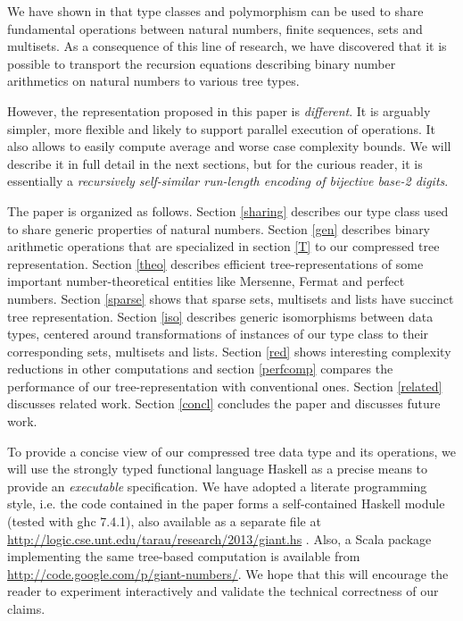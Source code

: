 \documentclass{TOOLS/llncs}
\begin{document}
We have shown in \cite{ppdp10tarau} that type classes
and polymorphism can be used to
share fundamental operations between natural numbers, 
finite sequences, sets and multisets.
As a consequence of this line of research, we have
discovered that it is possible to transport the recursion equations
describing binary number arithmetics on natural numbers
to various tree types.

However, the representation proposed in this paper is {\em different}. It is arguably 
simpler, more flexible and likely to support parallel execution of
operations.  It also allows to easily compute average and worse
case complexity bounds. We will describe it in full detail in the next
sections, but for the curious reader, it is essentially a {\em recursively self-similar 
run-length encoding of bijective base-2 digits}.


The paper is organized as follows. Section \ref{sharing} describes 
our type class used to share generic properties of natural numbers.
Section \ref{gen} describes binary arithmetic operations that
are specialized in section \ref{T} to our compressed tree representation.
Section \ref{theo} describes efficient tree-representations 
of some important number-theoretical entities like Mersenne, Fermat and
perfect numbers. 
Section \ref{sparse} shows that sparse sets, multisets and lists
have succinct tree representation.
Section \ref{iso} describes
generic isomorphisms between data types, centered
around transformations of instances of
our type class to their corresponding sets, multisets and lists.
Section \ref{red} shows interesting complexity reductions
in other computations and
section \ref{perfcomp} compares the performance of our tree-representation
with conventional ones.
Section \ref{related} discusses related work.
Section \ref{concl} concludes the paper and discusses future work.

To provide a concise view of our compressed tree data type and its operations, we will
use the strongly typed functional language Haskell as a precise means to
provide an {\em executable} specification. We have adopted
a literate programming style, i.e. the
code contained in the paper
forms a self-contained Haskell module (tested with ghc 7.4.1),
also available as a separate file at
\url{http://logic.cse.unt.edu/tarau/research/2013/giant.hs} .
Also, a Scala package implementing the same tree-based computation
is available from \url{http://code.google.com/p/giant-numbers/}.
We hope that this will encourage the reader to
experiment interactively and validate the
technical correctness of our claims.
\end{document}
